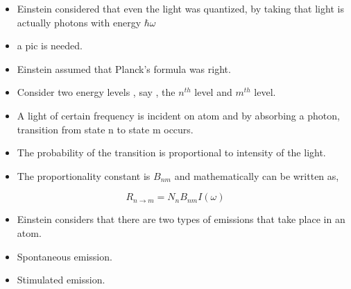 \documentclass[aspectratio=169]{beamer}
\begin{document}
\begin{frame}{}

	\begin{itemize}

		\item Einstein considered that even the light was quantized, by taking that light is actually photons with energy $\hbar \omega$   \newline
		\item a pic is needed.

	\end{itemize}
	
\end{frame}

\begin{frame}{}

	\begin{itemize}
	
		\item Einstein assumed that Planck's formula was right. \newline
		\item Consider two energy levels , say , the $n^{th}$ level and $m^{th}$ level. \newline
		\item A light of certain frequency is incident on atom and by absorbing a photon, transition from state n to state m occurs. 
 
	\end{itemize}
	
\end{frame}

\begin{frame}

	\begin{itemize}

		\item The probability of the transition is proportional to intensity of the light. \newline
		\item The proportionality constant is $B_{nm}$ and mathematically can be written as,
		
	\end{itemize}
		
			\begin{equation}
					 R_{n \to m} = N_{n} B_{nm} I(\omega) 	 
			\end{equation} 
						
\end{frame}

\begin{frame}{}

	\begin{itemize}

		\item Einstein considers that there are two types of emissions that take place in an atom. \newline
		\item Spontaneous emission. \newline
		\item Stimulated emission.
		
	\end{itemize}
	
\end{frame}
\end{document}
